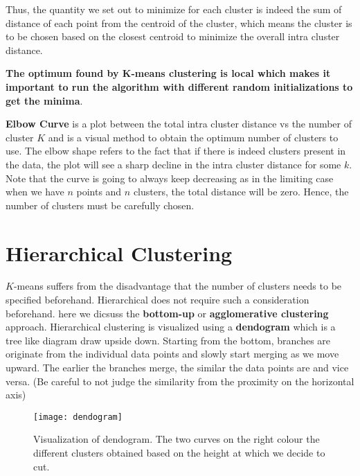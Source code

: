 \documentclass[../statistical_learning_notes.tex]{subfiles}
\begin{document}
    Thus, the quantity we set out to minimize for each cluster is indeed the sum of distance of each point from the centroid of the cluster, which means the cluster is to be chosen based on the closest centroid to minimize the overall intra cluster distance.\newline

    \textbf{The optimum found by K-means clustering is local which makes it important to run the algorithm with different random initializations to get the minima}.\newline

    \textbf{Elbow Curve} is a plot between the total intra cluster distance vs the number of cluster $K$ and is a visual method to obtain the optimum number of clusters to use. The elbow shape refers to the fact that if there is indeed clusters present in the data, the plot will see a sharp decline in the intra cluster distance for some $k$.\newline
    Note that the curve is going to always keep decreasing as in the limiting case when we have $n$ points and $n$ clusters, the total distance will be zero. Hence, the number of clusters must be carefully chosen.


    \section{Hierarchical Clustering}
    $K$-means suffers from the disadvantage that the number of clusters needs to be specified beforehand. Hierarchical does not require such a consideration beforehand. here we dicsuss the \textbf{bottom-up} or \textbf{agglomerative clustering} approach. Hierarchical clustering is visualized using a \textbf{dendogram} which is a tree like diagram draw upside down. Starting from the bottom, branches are originate from the individual data points and slowly start merging as we move upward. The earlier the branches merge, the similar the data points are and vice versa. (Be careful to not judge the similarity from the proximity on the horizontal axis)\newline

    \begin{figure}[h]
    \texttt{[image: dendogram]}
    \centering
    \caption{Visualization of dendogram. The two curves on the right colour the different clusters obtained based on the height at which we decide to cut.}
    \label{fig:dendogram} %
    \end{figure}
\end{document}
